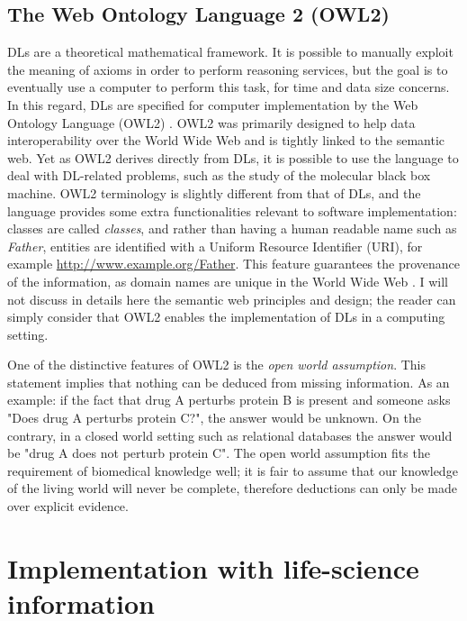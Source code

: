 \subsection{The Web Ontology Language 2 (OWL2)}
DLs are a theoretical mathematical framework. It is possible to manually exploit the meaning of axioms in order to perform reasoning services, but the goal is to eventually use a computer to perform this task, for time and data size concerns. In this regard, DLs are specified for computer implementation by the Web Ontology Language (OWL2) \citep{owlw3c}. OWL2 was primarily designed to help data interoperability over the World Wide Web and is tightly linked to the semantic web. Yet as OWL2 derives directly from DLs, it is possible to use the language to deal with DL-related problems, such as the study of the molecular black box machine. OWL2 terminology is slightly different from that of DLs, and the language provides some extra functionalities relevant to software implementation: classes are called \emph{classes}, and rather than having a human readable name such as \emph{Father}, entities are identified with a Uniform Resource Identifier (URI), for example \url{http://www.example.org/Father}. This feature guarantees the provenance of the information, as domain names are unique in the World Wide Web \citep{berners2001semantic}. I will not discuss in details here the semantic web principles and design; the reader can simply consider that OWL2 enables the implementation of DLs in a computing setting.

One of the distinctive features of OWL2 is the \emph{open world assumption}. This statement implies that nothing can be deduced from missing information. As an example: if the fact that drug A perturbs protein B is present and someone asks "Does drug A perturbs protein C?", the answer would be unknown. On the contrary, in a closed world setting such as relational databases the answer would be "drug A does not perturb protein C". The open world assumption fits the requirement of biomedical knowledge well; it is fair to assume that our knowledge of the living world will never be complete, therefore deductions can only be made over explicit evidence.

\section{Implementation with life-science information}

